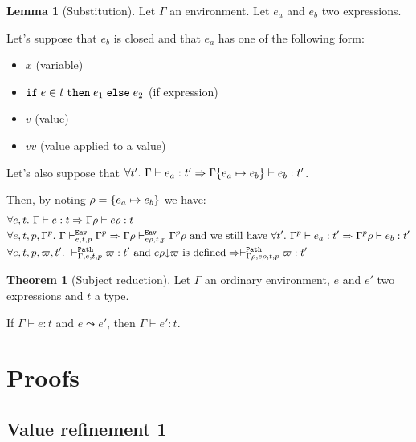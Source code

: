 \documentclass[a4paper]{article}
\theoremstyle{definition}
\newtheorem{theorem}{Theorem}
\newtheorem{lemma}{Lemma}
\begin{document}
        \begin{lemma}[Substitution]
          Let $\Gamma$ an environment. Let $e_a$ and $e_b$ two expressions.

          Let's suppose that $e_b$ is closed and that $e_a$ has one of the following form:
          \begin{itemize}
            \item $x$ (variable)
            \item $\ite e t {e_1} {e_2}$ (if expression)
            \item $v$ (value)
            \item $v v$ (value applied to a value)
          \end{itemize}
          Let's also suppose that $\forall t'.\ \Gamma \vdash e_a : t' \Rightarrow \Gamma\subst {e_a} {e_b} \vdash e_b:t'$.
          
          Then, by noting $\rho = \subst {e_a} {e_b}$ we have:
          \begin{align*}
            &\forall e,t.\ \Gamma \vdash e:t \Rightarrow \Gamma\rho \vdash e\rho:t\\
            &\forall e,t,p,\Gamma^p.\ \Gamma \evdash p {e} {t} \Gamma^p \Rightarrow \Gamma\rho \evdash p {e\rho} {t} {\Gamma^p}\rho
            \text{ and we still have } \forall t'.\ \Gamma^p \vdash e_a : t' \Rightarrow \Gamma^p\rho \vdash e_b:t'\\
            &\forall e,t,p,\varpi,t'.\ \pvdash \Gamma p e t \varpi:t' \text{ and }\occ {e\rho} \varpi\text{ is defined} \Rightarrow \pvdash {\Gamma\rho} p {e\rho} t \varpi:t'
          \end{align*}
        \end{lemma}

        \begin{theorem}[Subject reduction]
          Let $\Gamma$ an ordinary environment, $e$ and $e'$ two expressions and $t$ a type.

          If $\Gamma\vdash e:t$ and $e\leadsto e'$, then $\Gamma\vdash e':t$.
        \end{theorem}

        \section{Proofs}

        \subsection{Value refinement 1}
\end{document}
